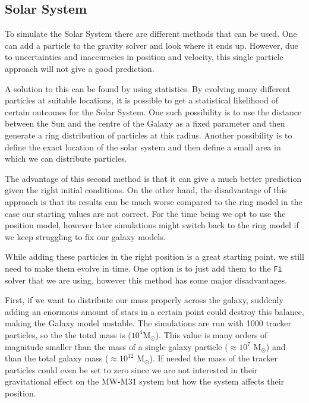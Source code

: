 \documentclass[a4paper,12pt, english]{article}
\begin{document}
\subsection{Solar System}
\label{solar-system}
To simulate the Solar System there are different methods that can be used. One can add a particle to the gravity solver and look where it ends up. However, due to uncertainties and inaccuracies in position and velocity, this single particle approach will not give a good prediction.\par
\smallskip
A solution to this can be found by using statistics. By evolving many different particles at suitable locations, it is possible to get a statistical likelihood of certain outcomes for the Solar System. One such possibility is to use the distance between the Sun and the centre of the Galaxy as a fixed parameter and then generate a ring distribution of particles at this radius. Another possibility is to define the exact location of the solar system and then define a small area in which we can distribute particles.\par
\smallskip
The advantage of this second method is that it can give a much better prediction given the right initial conditions. On the other hand, the disadvantage of this approach is that its results can be much worse compared to the ring model in the case our starting values are not correct. For the time being we opt to use the position model, however later simulations might switch back to the ring model if we keep struggling to fix our galaxy models.\par
\smallskip
While adding these particles in the right position is a great starting point, we still need to make them evolve in time. One option is to just add them to the \texttt{Fi} solver that we are using, however this method has some major disadvantages.\par
\smallskip
First, if we want to distribute our mass properly across the galaxy, suddenly adding an enormous amount of stars in a certain point could destroy this balance, making the Galaxy model unstable. The simulations are run with 1000 tracker particles, so the the total mass is ($10^4$M$_{\odot}$). This value is many orders of magnitude smaller than the mass of a single galaxy particle ($\approx 10^7$ M$_{\odot}$) and than the total galaxy mass ($\approx 10^{12}$ M$_{\odot}$). If needed the mass of the tracker particles could even be set to zero since we are not interested in their gravitational effect on the MW-M31 system but how the system affects their position. \par
\smallskip
\end{document}
